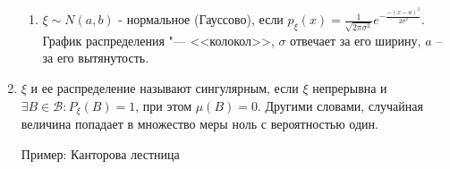 \begin{enumerate}[label=\Roman*.]
\begin{enumerate}[label=\arabic*.]
    \item $\xi \sim N(a, b)$ - нормальное (Гауссово), если $p_{\xi}(x)= \frac{1}{\sqrt{2 \pi \sigma^2}} e^{-\frac{-(x-a)^2}{2\sigma^2}}$.
    График распределения "--- <<колокол>>, $\sigma$ отвечает за его ширину, $a$ -- за его вытянутость.

    \end{enumerate}
    
    \item
    \begin{Def}
    	$\xi$ и ее распределение называют сингулярным, если $\xi$ непрерывна и $\exists B \in \mathcal{B}\colon P_{\xi}(B) = 1$, при этом $\mu(B) = 0$.
    	Другими словами, случайная величина попадает в множество меры ноль с вероятностью один.
	\end{Def}
    Пример: Канторова лестница
\end{enumerate}